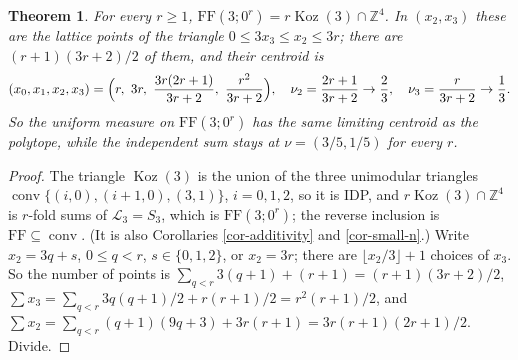 \documentclass[11pt, a4paper, abstract=yes]{scrartcl}
\theoremstyle{definition}
\theoremstyle{remark}
\theoremstyle{plain}
\newtheorem{theorem}[definition]{Theorem}
\theoremstyle{remark}
\theoremstyle{plain}
\newcommand{\Koz}{\operatorname{Koz}}
\newcommand{\conv}{\operatorname{conv}}
\newcommand{\FF}{\mathrm{FF}}
\newcommand{\leandiscof}[1]{\tikz[baseline=-0.6ex]\fill[#1] (0,0) circle (0.6ex);}
\newcommand{\leanfull}{\leandiscof{leanfull}}
\newcommand{\leanmark}[1]{\leavevmode{\reversemarginpar\marginnote{\raggedleft#1}}}
\begin{document}
\begin{theorem}
\leanmark{\leanfull}For every \(r\ge1\), \(\FF(3;0^r)=r\Koz(3)\cap\mathbb Z^4\). In \((x_2,x_3)\) these are the lattice
points of the triangle \(0\le3x_3\le x_2\le3r\); there are \((r+1)(3r+2)/2\) of them, and their
centroid is
\[
  (x_0,x_1,x_2,x_3)=\Bigl(r,\ 3r,\ \frac{3r(2r+1)}{3r+2},\ \frac{r^2}{3r+2}\Bigr),
  \quad \nu_2=\frac{2r+1}{3r+2}\to\frac23,\quad \nu_3=\frac r{3r+2}\to\frac13 .
\]
So the uniform measure on \(\FF(3;0^r)\) has the same limiting centroid as the polytope, while the
independent sum stays at \(\nu=(3/5,1/5)\) for every \(r\).
\label{thm-n3-equal-shifts}
\end{theorem}

\begin{proof}
The triangle \(\Koz(3)\) is the union of the three unimodular triangles
\(\conv\lbrace(i,0),(i+1,0),(3,1)\rbrace\), \(i=0,1,2\), so it is IDP, and \(r\Koz(3)\cap\mathbb Z^4\) is
\(r\)-fold sums of \(\mathcal L_3=S_3\), which is \(\FF(3;0^r)\); the reverse inclusion is
\(\FF\subseteq\conv\). (It is also Corollaries \ref{cor-additivity} and \ref{cor-small-n}.) Write
\(x_2=3q+s\), \(0\le q<r\), \(s\in\lbrace0,1,2\rbrace\), or \(x_2=3r\); there are
\(\lfloor x_2/3\rfloor+1\) choices of \(x_3\). So the number of points is
\(\sum_{q<r}3(q+1)+(r+1)=(r+1)(3r+2)/2\), \(\sum x_3=\sum_{q<r}3q(q+1)/2+r(r+1)/2=r^2(r+1)/2\), and
\(\sum x_2=\sum_{q<r}(q+1)(9q+3)+3r(r+1)=3r(r+1)(2r+1)/2\). Divide.
\end{proof}
\end{document}
